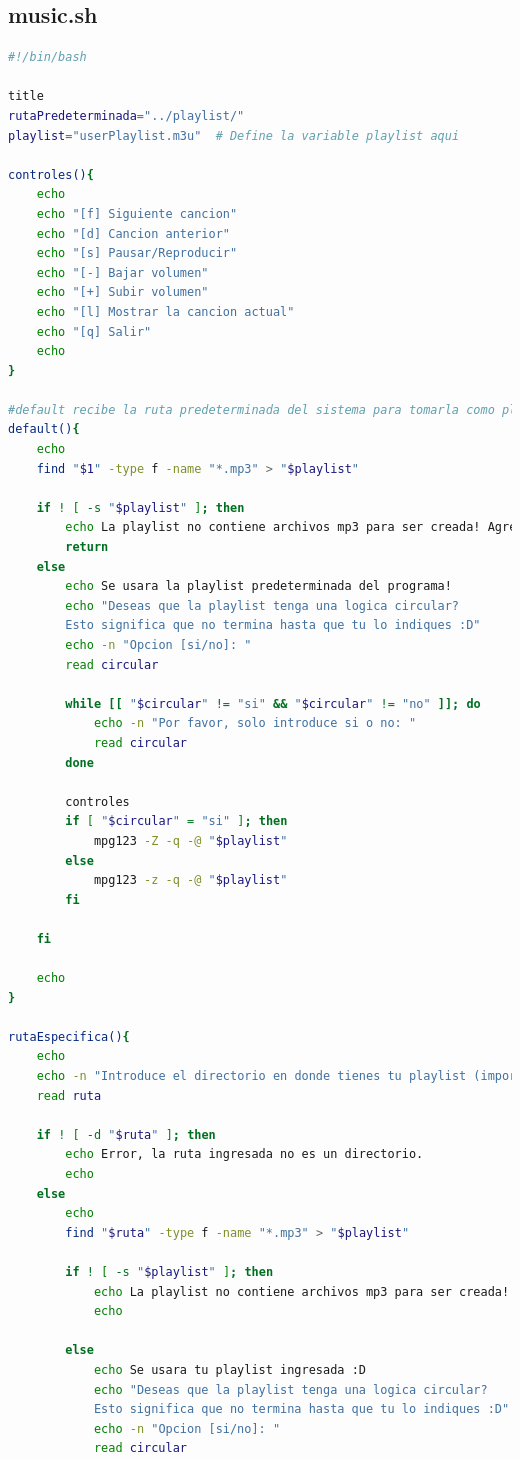 \documentclass[letter,11pt]{article}
\begin{document}
\subsection{music.sh}
\begin{lstlisting}[language=sh, caption={Reproductor}, label={lst:shellscript}, basicstyle=\small]
#!/bin/bash

title
rutaPredeterminada="../playlist/"
playlist="userPlaylist.m3u"  # Define la variable playlist aqui

controles(){
    echo
    echo "[f] Siguiente cancion"
    echo "[d] Cancion anterior"
    echo "[s] Pausar/Reproducir"
    echo "[-] Bajar volumen"
    echo "[+] Subir volumen"
    echo "[l] Mostrar la cancion actual"
    echo "[q] Salir"
    echo
}

#default recibe la ruta predeterminada del sistema para tomarla como playlist
default(){
    echo
    find "$1" -type f -name "*.mp3" > "$playlist"

    if ! [ -s "$playlist" ]; then
        echo La playlist no contiene archivos mp3 para ser creada! Agrega canciones plox.
        return
    else
        echo Se usara la playlist predeterminada del programa!
        echo "Deseas que la playlist tenga una logica circular? 
        Esto significa que no termina hasta que tu lo indiques :D"
        echo -n "Opcion [si/no]: "
        read circular

        while [[ "$circular" != "si" && "$circular" != "no" ]]; do
            echo -n "Por favor, solo introduce si o no: "
            read circular
        done

        controles
        if [ "$circular" = "si" ]; then 
            mpg123 -Z -q -@ "$playlist"
        else
            mpg123 -z -q -@ "$playlist"
        fi
        
    fi

    echo
}

rutaEspecifica(){
    echo
    echo -n "Introduce el directorio en donde tienes tu playlist (importante que termine en '/'): "
    read ruta

    if ! [ -d "$ruta" ]; then
        echo Error, la ruta ingresada no es un directorio.
        echo
    else
        echo
        find "$ruta" -type f -name "*.mp3" > "$playlist"

        if ! [ -s "$playlist" ]; then
            echo La playlist no contiene archivos mp3 para ser creada! Agrega canciones plox.
            echo
            
        else
            echo Se usara tu playlist ingresada :D
            echo "Deseas que la playlist tenga una logica circular? 
            Esto significa que no termina hasta que tu lo indiques :D"
            echo -n "Opcion [si/no]: "
            read circular


\end{lstlisting}
\end{document}
